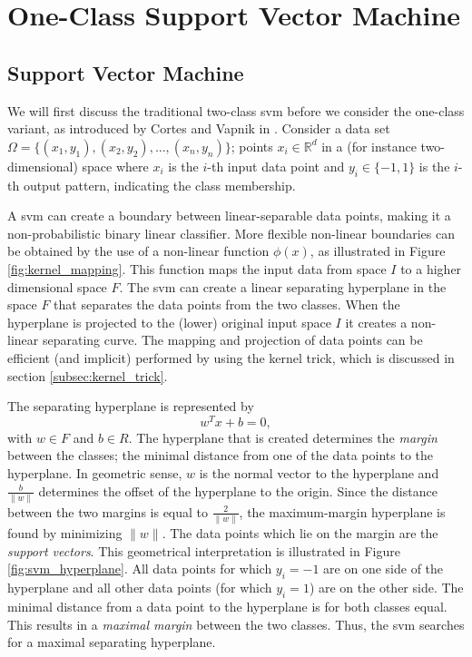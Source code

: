 \section{One-Class Support Vector Machine}\label{sec:one_class_svm}


\subsection{Support Vector Machine}\label{subsec:svm}
We will first discuss the traditional two-class \gls{svm} before we consider the one-class variant, as introduced by Cortes and Vapnik in \cite{cortes1995support}.
Consider a data set $\Omega = \{ (x_1, y_1),\allowbreak (x_2, y_2), \dots , (x_n, y_n) \}$; points $x_i \in \mathbb{R}^d$ in a (for instance two-dimensional) space where $x_i$ is the $i$-th input data point and $y_i \in \{-1, 1\}$ is the $i$-th output pattern, indicating the class membership.

A \gls{svm} can create a boundary between linear-separable data points, making it a non-probabilistic binary linear classifier.
More flexible non-linear boundaries can be obtained by the use of a non-linear function $\phi(x)$, as illustrated in Figure \ref{fig:kernel_mapping}.
This function maps the input data from space $I$ to a higher dimensional space $F$.
The \gls{svm} can create a linear separating hyperplane in the space $F$ that separates the data points from the two classes.
When the hyperplane is projected to the (lower) original input space $I$ it creates a non-linear separating curve.
The mapping and projection of data points can be efficient (and implicit) performed by using the kernel trick, which is discussed in section \ref{subsec:kernel_trick}.

The separating hyperplane is represented by
\begin{equation}
w^T x + b = 0,
\end{equation}
with $w \in F$ and $b \in R$.
The hyperplane that is created determines the \emph{margin} between the classes; the minimal distance from one of the data points to the hyperplane.
In geometric sense, $w$ is the normal vector to the hyperplane and $\frac{b}{\lVert{w}\rVert}$ determines the offset of the hyperplane to the origin.
Since the distance between the two margins is equal to $\frac{2}{\lVert{w}\rVert}$, the maximum-margin hyperplane is found by minimizing $\lVert{w}\rVert$.
The data points which lie on the margin are the \emph{support vectors}.
This geometrical interpretation is illustrated in Figure \ref{fig:svm_hyperplane}.
All data points for which $y_i = -1$ are on one side of the hyperplane and all other data points (for which $y_i = 1$) are on the other side.
The minimal distance from a data point to the hyperplane is for both classes equal.
This results in a \emph{maximal margin} between the two classes.
Thus, the \gls{svm} searches for a maximal separating hyperplane.

